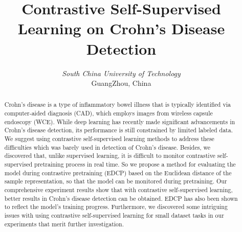 \documentclass[conference]{IEEEtran}
\begin{document}
\title{Contrastive Self-Supervised Learning on Crohn's Disease Detection\\

}



\author{
\textit{South China University of Technology}\\
GuangZhou, China \\
\and
{}
}

\maketitle

\begin{abstract}

Crohn's disease is a type of inflammatory bowel illness that is typically identified via computer-aided diagnosis (CAD), which employs images from wireless capsule endoscopy (WCE). While deep learning has recently made significant advancements in Crohn's disease detection, its performance is still constrained by limited labeled data. We suggest using contrastive self-supervised learning methods to address these difficulties  which was barely used in detection of Crohn's disease. 
Besides, we discovered that, unlike supervised learning, it is difficult to monitor contrastive self-supervised pretraining process in real time. So we propose a method for evaluating the model during contrastive pretraining (EDCP) based on the Euclidean distance of the sample representation, so that the model can be monitored during pretraining.
Our comprehensive experiment results show that with contrastive self-supervised learning, better results in Crohn's disease detection can be obtained.
EDCP has also been shown to reflect the model's training progress. Furthermore, we discovered some intriguing issues with using contrastive self-supervised learning for small dataset tasks in our experiments that merit further investigation.
\end{abstract}
\end{document}
